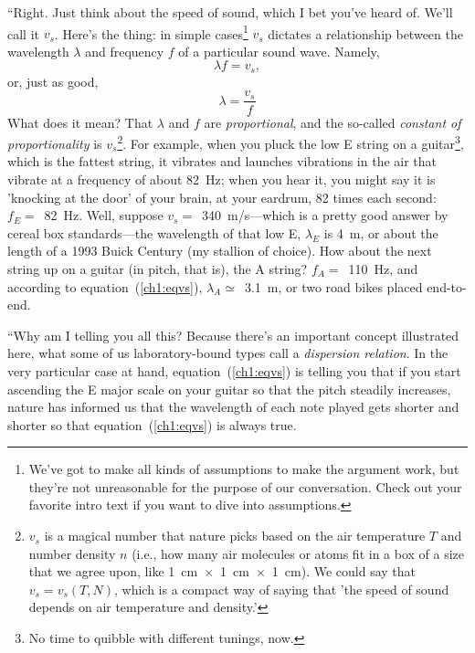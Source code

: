 \X ``Right. Just think about the speed of sound, which I bet you've
heard of. We'll call it $v_s$. Here's the thing: in simple
cases\footnote{We've got to make all kinds of assumptions to make the
  argument work, but they're not unreasonable for the purpose of our
  conversation. Check out your favorite intro text if you want to dive
  into assumptions.} $v_s$ dictates a relationship between the
wavelength $\lambda$ and frequency $f$ of a particular sound wave. Namely,
\begin{equation}
  \label{ch1:eqvs}
  \lambda f = v_s,
\end{equation}
or, just as good,
\begin{equation}
  \label{ch1:eqvsdiff}
  \lambda = \frac{v_s}{f}
\end{equation}
What does it mean? That $\lambda$ and $f$ are \emph{proportional}, and
the so-called \emph{constant of proportionality} is
$v_s$\footnote{$v_s$ is a magical number that nature picks based on
  the air temperature $T$ and number density $n$ (i.e., how many air
  molecules or atoms fit in a box of a size that we agree upon, like
  1~cm~$\times$~1~cm~$\times$~1~cm). We could say that $v_s = v_s (T,
  N)$, which is a compact way of saying that 'the speed of sound
  depends on air temperature and density.'}. For example, when you
pluck the low E string on a guitar\footnote{No time to quibble with
  different tunings, now.}, which is the fattest string, it vibrates
and launches vibrations in the air that vibrate at a frequency of
about 82~Hz; when you hear it, you might say it is 'knocking at the
door' of your brain, at your eardrum, 82 times each second: $f_E =
$~82~Hz. Well, suppose $v_s =$~340~m/s---which is a pretty good answer
by cereal box standards---the wavelength of that low E, $\lambda_E$ is
4~m, or about the length of a 1993 Buick Century (my stallion of
choice). How about the next string up on a guitar (in pitch, that is),
the A string? $f_A = $~110~Hz, and according to
equation~(\ref{ch1:eqvs}), $\lambda_A \simeq$~3.1~m, or two road bikes
placed end-to-end.

\X ``Why am I telling you all this? Because there's an important
concept illustrated here, what some of us laboratory-bound types call
a \emph{dispersion relation}. In the very particular case at hand,
equation~(\ref{ch1:eqvs}) is telling you that if you start ascending
the E major scale on your guitar so that the pitch steadily increases,
nature has informed us that the wavelength of each note played gets
shorter and shorter so that equation~(\ref{ch1:eqvs}) is always true.

